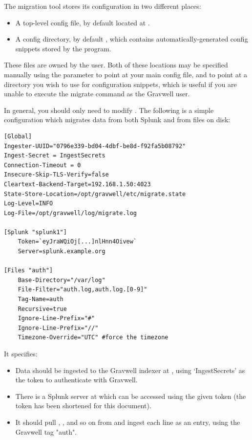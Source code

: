 The migration tool stores its configuration in two different places:

\begin{itemize}
\item A top-level config file, by default located at .
\item A config directory, by default , which contains automatically-generated config snippets stored by the program.
\end{itemize}

These files are owned by the  user. Both of these locations may be specified manually using the  parameter to point at your main config file, and  to point at a directory you wish to use for configuration snippets, which is useful if you are unable to execute the migrate command as the Gravwell user.

In general, you should only need to modify . The following is a simple configuration which migrates data from both Splunk and from files on disk:

\begin{verbatim}
[Global]
Ingester-UUID="0796e339-bd04-4dbf-be8d-f92fa5b08792"
Ingest-Secret = IngestSecrets
Connection-Timeout = 0
Insecure-Skip-TLS-Verify=false
Cleartext-Backend-Target=192.168.1.50:4023
State-Store-Location=/opt/gravwell/etc/migrate.state
Log-Level=INFO
Log-File=/opt/gravwell/log/migrate.log

[Splunk "splunk1"]
	Token=`eyJraWQiOj[...]nlHnn4Oivew`
	Server=splunk.example.org

[Files "auth"]
	Base-Directory="/var/log"
	File-Filter="auth.log,auth.log.[0-9]"
	Tag-Name=auth
	Recursive=true
	Ignore-Line-Prefix="#"
	Ignore-Line-Prefix="//"
	Timezone-Override="UTC" #force the timezone
\end{verbatim}

It specifies:

\begin{itemize}
\item Data should be ingested to the Gravwell indexer at , using `IngestSecrets' as the token to authenticate with Gravwell.
\item There is a Splunk server at  which can be accessed using the given token (the token has been shortened for this document).
\item It should pull , ,  and so on from  and ingest each line as an entry, using the Gravwell tag "auth".
\end{itemize}

